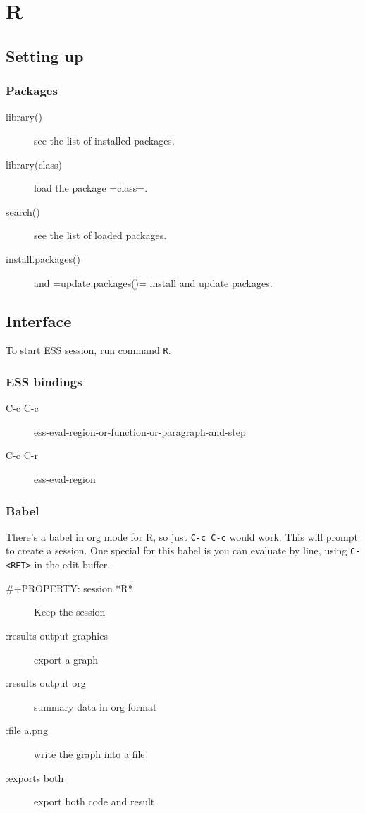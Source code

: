 \section{R}

\subsection{Setting up}
\subsubsection{Packages}
\begin{description}
\item [library()] see the list of installed packages.
\item [library(class)] load the package =class=.
\item [search()] see the list of loaded packages.
\item [install.packages()] and =update.packages()= install and update packages.
\end{description}

\subsection{Interface}
To start ESS session, run command \texttt{R}.

\subsubsection{ESS bindings}
\begin{description}
\item [C-c C-c] ess-eval-region-or-function-or-paragraph-and-step
\item [C-c C-r] ess-eval-region
\end{description}

\subsubsection{Babel}
There's a babel in org mode for R, so just \texttt{C-c C-c} would
work.  This will prompt to create a session.  One special for this
babel is you can evaluate by line, using \texttt{C-<RET>} in the edit
buffer.

\begin{description}
\item [\#+PROPERTY: session *R*] Keep the session
\item [:results output graphics] export a graph
\item [:results output org] summary data in org format
\item [:file a.png] write the graph into a file
\item [:exports both] export both code and result
\end{description}




